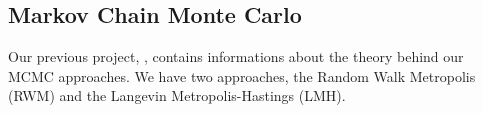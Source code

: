 

\subsection{Markov Chain Monte Carlo}
Our previous project, \citep{project1}, contains informations about the theory behind our MCMC approaches. We have two approaches, the Random Walk Metropolis (RWM) and the Langevin Metropolis-Hastings (LMH). 

